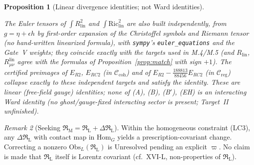 \documentclass{article}
\newtheorem{proposition}{Proposition}
\theoremstyle{remark}
\newtheorem{remark}[proposition]{Remark}
\newcommand{\RL}{\mathfrak R_{\mathrm L}}
\newcommand{\RM}{\mathfrak R_{\mathrm M}}
\newcommand{\Ccoh}{\mathcal C_{\mathrm{coh}}}
\newcommand{\Creg}{\mathcal C_{\mathrm{reg}}}
\begin{document}
\begin{proposition}[Linear divergence identities; not Ward identities]
\begin{enumerate}
\end{enumerate}
The Euler tensors of $\int R_{\mathrm{lin}}^2$ and $\int\mathrm{Ric}_{\mathrm{lin}}^2$ are also built independently, from $g=\eta+\epsilon h$ by first-order expansion of the Christoffel symbols and Riemann tensor (no hand-written linearized formula), with \texttt{sympy}'s \texttt{euler\_equations} and the Gate~V weights; they coincide exactly with the targets used in M.4/M.5 (and $R_{\mathrm{lin}}$, $R^{\mathrm{lin}}_{\mu\nu}$ agree with the formulas of Proposition~\ref{prop:match} with sign $+1$).
The certified preimages of $E_{R2}$, $E_{RC2}$ (in $\Ccoh$) and of $E_{R2}-\tfrac{188813}{88456}E_{RC2}$ (in $\Creg$) collapse exactly to these independent targets and satisfy the identity.
These are linear (free-field gauge) identities; none of (A), (B), (B$'$), (EH) is an interacting Ward identity (no ghost/gauge-fixed interacting sector is present; Target~II unfinished).
\end{proposition}

\begin{remark}[Seeking $\RM=\RL+\Delta\RL$]
\label{rem:M7-RM}
Within the homogeneous constraint (LC3), any $\Delta\RL$ with contact map in $\mathrm{Hom}_G$ yields a prescription-covariant change.
Correcting a nonzero $\mathrm{Obs}_L(\RL)$ is Unresolved pending an explicit $\varpi$.
No claim is made that $\RL$ itself is Lorentz covariant (cf.\ XVI-L, non-properties of $\RL$).
\end{remark}
\end{document}
